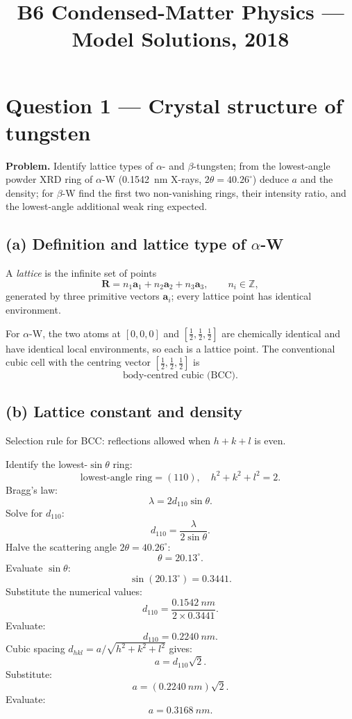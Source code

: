 \documentclass[11pt]{article}
\title{B6 Condensed-Matter Physics --- Model Solutions, 2018}
\author{}
\date{}
\begin{document}
\maketitle

\section*{Question 1 --- Crystal structure of tungsten}

\textbf{Problem.} Identify lattice types of $\alpha$- and $\beta$-tungsten; from the lowest-angle powder XRD ring of $\alpha$-W (\SI{0.1542}{nm} X-rays, $2\theta=40.26^\circ$) deduce $a$ and the density; for $\beta$-W find the first two non-vanishing rings, their intensity ratio, and the lowest-angle additional weak ring expected.

\subsection*{(a) Definition and lattice type of $\alpha$-W}

A \emph{lattice} is the infinite set of points
\[
\bm R = n_1\bm a_1 + n_2\bm a_2 + n_3\bm a_3,\qquad n_i\in\mathbb Z,
\]
generated by three primitive vectors $\bm a_i$; every lattice point has identical environment.

For $\alpha$-W, the two atoms at $[0,0,0]$ and $[\tfrac12,\tfrac12,\tfrac12]$ are chemically identical and have identical local environments, so each is a lattice point. The conventional cubic cell with the centring vector $[\tfrac12,\tfrac12,\tfrac12]$ is
\[
\boxed{\;\text{body-centred cubic (BCC).}\;}
\]

\subsection*{(b) Lattice constant and density}

Selection rule for BCC: reflections allowed when $h+k+l$ is even.

Identify the lowest-$\sin\theta$ ring:
\[
\text{lowest-angle ring} = (110),\quad h^2+k^2+l^2 = 2.
\]
Bragg's law:
\[
\lambda = 2 d_{110}\sin\theta.
\]
Solve for $d_{110}$:
\[
d_{110} = \frac{\lambda}{2\sin\theta}.
\]
Halve the scattering angle $2\theta=40.26^\circ$:
\[
\theta = 20.13^\circ.
\]
Evaluate $\sin\theta$:
\[
\sin(20.13^\circ) = 0.3441.
\]
Substitute the numerical values:
\[
d_{110} = \frac{\SI{0.1542}{nm}}{2\times 0.3441}.
\]
Evaluate:
\[
d_{110} = \SI{0.2240}{nm}.
\]
Cubic spacing $d_{hkl}=a/\sqrt{h^2+k^2+l^2}$ gives:
\[
a = d_{110}\sqrt{2}.
\]
Substitute:
\[
a = (\SI{0.2240}{nm})\sqrt{2}.
\]
Evaluate:
\[
\boxed{\;a = \SI{0.3168}{nm}.\;}
\]
\end{document}
